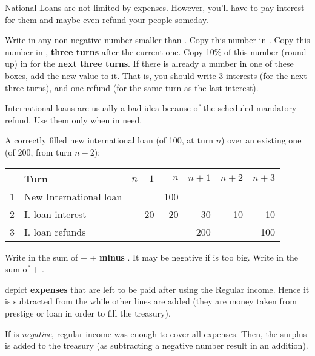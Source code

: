 \begin{designnote}
  National Loans are not limited by expenses. However, you'll have to pay
  interest for them and maybe even refund your people someday.
\end{designnote}

 Write in  any
non-negative number smaller than .
\bparag Copy this number in .
\bparag Copy this number in ,
\textbf{three turns} after the current one.
\bparag Copy 10\% of this number (round up) in  for the \textbf{next three turns}. If there is already a
number in one of these boxes, add the new value to it.
\bparag That is, you should write 3 interests (for the next three turns), and
one refund (for the same turn as the last interest).

\begin{playtip}
  International loans are usually a bad idea because of the scheduled
  mandatory refund. Use them only when in need.
\end{playtip}

\begin{exemple}
  A correctly filled new international loan (of 100\ducats, at turn $n$) over
  an existing one (of 200\ducats, from turn $n-2$):
  \begin{tabular}{|c|l|r|r|r|r|r|}
    \hline
    & Turn & $n-1$ & $n$ & $n+1$ & $n+2$ & $n+3$\\
    \hline
    1 & New International loan & & 100 & & &\\
    \hline
    2 & I. loan interest & 20 & 20 & 30 & 10 & 10\\
    \hline
    3 & I. loan refunds & & & 200 & & 100\\
    \hline
  \end{tabular}
\end{exemple}

\aparag[New \RT]
\bparag Write in  the sum of  +  + 
\textbf{minus} . It may be negative if
 is too big.
\bparag Write in  the sum of
 + .

\begin{designnote}
   depict \textbf{expenses} that are left
  to be paid after using the Regular income. Hence it is subtracted from the
  \RT while other lines are added (they are money taken from prestige or loan
  in order to fill the treasury).

  If  is \emph{negative}, regular income was
  enough to cover all expenses. Then, the surplus is added to the treasury (as
  subtracting a negative number result in an addition).
\end{designnote}

